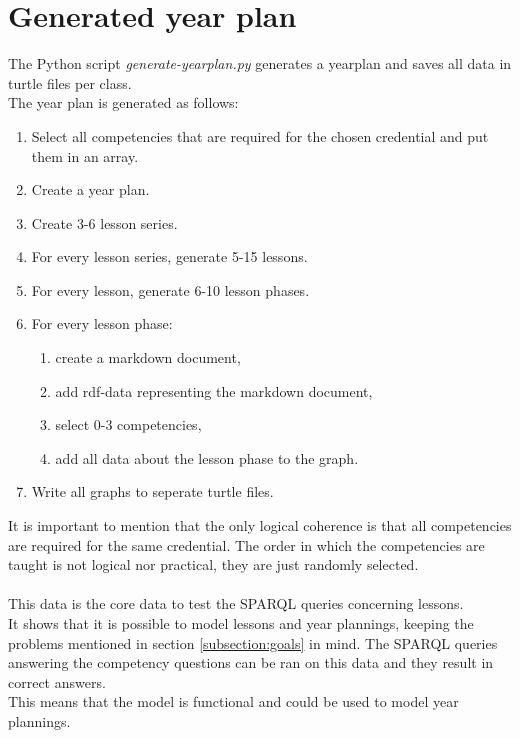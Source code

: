 \documentclass[a4paper]{report}
\begin{document}
    \section{Generated year plan}
    \label{subsection:generated-lessons}

    The Python script \emph{generate-yearplan.py} generates a yearplan and saves all data in turtle files per class.\\
    The year plan is generated as follows: 

    \begin{enumerate}
        \item Select all competencies that are required for the chosen credential and put them in an array.
        \item Create a year plan.
        \item Create 3-6 lesson series.
        \item For every lesson series, generate 5-15 lessons.
        \item For every lesson, generate 6-10 lesson phases.
        \item For every lesson phase:
            \begin{enumerate}
                \item create a markdown document,
                \item add rdf-data representing the markdown document,
                \item select 0-3 competencies,
                \item add all data about the lesson phase to the graph.
            \end{enumerate}
        \item Write all graphs to seperate turtle files.
    \end{enumerate}
    It is important to mention that the only logical coherence is that all competencies are required for the same credential.
    The order in which the competencies are taught is not logical nor practical, they are just randomly selected.\\ \\
    This data is the core data to test the SPARQL queries concerning lessons.\\
    It shows that it is possible to model lessons and year plannings, keeping the problems mentioned in section \ref{subsection:goals} in mind.
    The SPARQL queries answering the competency questions can be ran on this data and they result in correct answers.\\
    This means that the model is functional and could be used to model year plannings.
\end{document}
